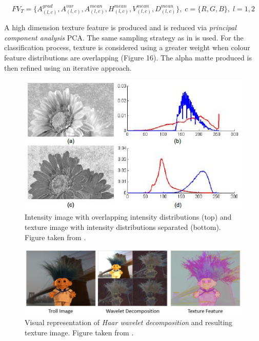 \begin{equation} \label{eq:texture-e1}
FV_{T}=\{A^{grad}_{(l,c)}, A^{var}_{(l,c)}, A^{mean}_{(l,c)}, H^{mean}_{(l,c)}, V^{mean}_{(l,c)}, D^{mean}_{(l,c)}\},\; c=\{R,G,B\},\; l=1,2
\end{equation}

A high dimension texture feature is produced and is reduced via \textit{principal component analysis} PCA. The same sampling strategy as in \cite{shared} is used. For the classification process, texture is considered using a greater weight when colour feature distributions are overlapping (Figure 16). The alpha matte produced is then refined using an iterative approach.

\begin{figure}[t!]
\centering
\includegraphics[width=0.8\columnwidth]{Chapter2/2/texture_figure_1.jpg}
\caption[Colour and texture image colour distributions.]{Intensity image with overlapping intensity distributions (top) and texture image with intensity distributions separated (bottom). Figure taken from \cite{texture}.}
\label{fig:texture-f1}
\end{figure}

\begin{figure}[t!]
\centering
\includegraphics[width=1\columnwidth]{Chapter2/2/texture_figure_2.jpg}
\caption[Haar wavelet decomposition and resulting texture image.]{Visual representation of \textit{Haar wavelet decomposition} and resulting texture image. Figure taken from \cite{texture}.}
\label{fig:texture-f2}
\end{figure}

